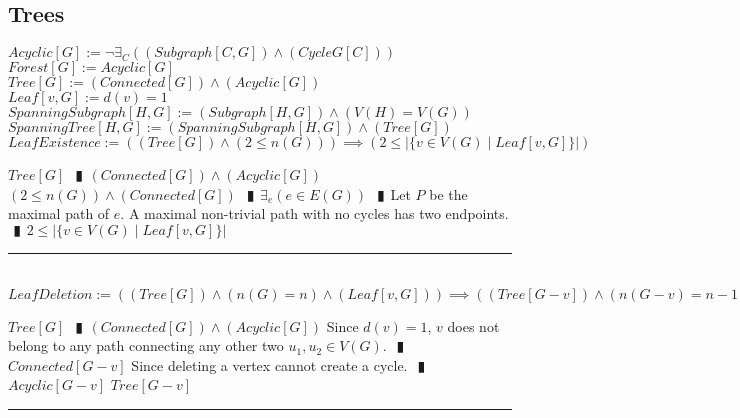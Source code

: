 \documentclass{book}
\newcommand{\abr}{:=}
\newcommand{\pipe}{$\phantom{(}\vrectangleblack\phantom{)}$}
\newcommand{\st}{\mathbin{|}}
\begin{document}


\subsection{Trees}
$Acyclic[G] \abr \lnot \exists_{C}((Subgraph[C, G]) \land (CycleG[C]))$ \\
$Forest[G] \abr Acyclic[G]$ \\
$Tree[G] \abr (Connected[G]) \land (Acyclic[G])$ \\
$Leaf[v, G] \abr d(v) = 1$ \\
$SpanningSubgraph[H, G] \abr (Subgraph[H, G]) \land (V(H) = V(G))$ \\
$SpanningTree[H, G] \abr (SpanningSubgraph[H, G]) \land (Tree[G])$ \\

$LeafExistence \abr ((Tree[G]) \land (2 \leq n(G))) \implies (2 \leq |\{v \in V(G) \st Leaf[v, G]\}|)$
\begin{enumerate}
  \lit $Tree[G]$ \pipe $(Connected[G]) \land (Acyclic[G])$
  \lit $(2 \leq n(G)) \land (Connected[G])$ \pipe $\exists_{e}(e \in E(G))$ \pipe Let $P$ be the maximal path of $e$.
  \lit A maximal non-trivial path with no cycles has two endpoints. \pipe $2 \leq |\{v \in V(G) \st Leaf[v, G]\}|$
\end{enumerate} \vspace{.75mm} \hrule \vspace{.75mm} \ \\ 

$LeafDeletion \abr ((Tree[G]) \land (n(G) = n) \land (Leaf[v, G])) \implies ((Tree[G - v]) \land (n(G - v) = n - 1))$
\begin{enumerate}
  \lit $Tree[G]$ \pipe $(Connected[G]) \land (Acyclic[G])$
  \lit Since $d(v) = 1$, $v$ does not belong to any path connecting any other two $u_1, u_2 \in V(G)$. \pipe $Connected[G - v]$
  \lit Since deleting a vertex cannot create a cycle. \pipe $Acyclic[G - v]$
  \lit $Tree[G - v]$
\end{enumerate} \vspace{.75mm} \hrule \vspace{.75mm} \ \\ 
\end{document}
